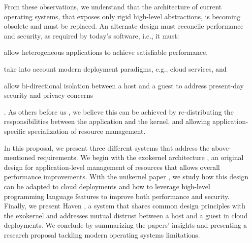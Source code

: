 From these observations, we understand that the architecture of current operating systems, that exposes only rigid high-level abstractions, is becoming obsolete and must be replaced.
An alternate design must reconcile performance and security, as required by today's software, i.e., it must:
\begin{enumerate*}
	\item allow heterogeneous applications to achieve satisfiable performance,
	\item take into account modern deployment paradigms, e.g., cloud services, and 
	\item allow bi-directional isolation between a host and a guest to address present-day security and privacy concerns
\end{enumerate*}.
As others before us \cite{DBLP:conf/sosp/EnglerKO95,DBLP:conf/hotos/EnglerK95,DBLP:conf/sosp/KaashoekEGBHMPGM97,DBLP:journals/tocs/CaoFKL96,DBLP:journals/sigops/HartyC92}, we believe this can be achieved by re-distributing the responsibilities between the application and the kernel, and allowing application-specific specialization of resource management.

In this proposal, we present three different systems that address the above-mentioned requirements.
We begin with the exokernel architecture \cite{DBLP:conf/sosp/EnglerKO95}, an original design for application-level management of resources that allows overall performance improvements.
With the unikernel paper \cite{DBLP:conf/asplos/MadhavapeddyMRSSGSHC13}, we study how this design can be adapted to cloud deployments and how to leverage high-level programming language features to improve both performance and security.
Finally, we present Haven \cite{DBLP:journals/tocs/BaumannPH15}, a system that shares common design principles with the exokernel and addresses mutual distrust between a host and a guest in cloud deployments.
We conclude by summarizing the papers' insights and presenting a research proposal tackling modern operating systems limitations.







